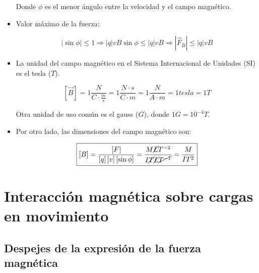 \documentclass[a4paper,10pt]{article}
\begin{document}
\begin{itemize}
Donde $\phi$ es el menor ángulo entre la velocidad y el campo magnético.

\item Valor máximo de la fuerza:

\begin{equation*}
    \left\lvert \sin\phi\right\lvert \leq 1
    \Rightarrow \left\lvert q\right\lvert vB\sin\phi
    \leq \left\lvert q\right\lvert vB \Rightarrow
    \boxed{
    \left\lvert\vec{F}_{B}\right\rvert \leq
    \left\lvert q\right\lvert vB
    }
\end{equation*}

\item La unidad del campo magnético en el Sistema Internacional de Unidades (SI)
es el tesla ($T$).

\begin{equation*}
    \boxed{
    \left[ \vec{B}\right] = 1 \frac{N}{C\cdot\frac{m}{s}}
    = 1 \frac{N\cdot s}{C\cdot m} = 1 \frac{N}{A\cdot m}
    = 1 tesla = 1 T
    }
\end{equation*}

Otra unidad de uso común es el gauss ($G$), donde $1 G = 10^{-4}T$.

\item Por otro lado, las dimensiones del campo magnético son:

\begin{equation*}
    \boxed{
    \left[ B\right] =
    \frac{\left[F\right]}{\left[ q\right]\left[v\right]\left[\sin\phi\right]}
    = \frac{M\cancel{L}T^{-2}}{I\cancel{T}\cancel{L}\cancel{T^{-1}}}
    = \frac{M}{IT^2}
    }
\end{equation*}

\end{itemize}



\section{Interacción magnética sobre cargas en movimiento}


\subsection{Despejes de la expresión de la fuerza magnética}
\end{document}
